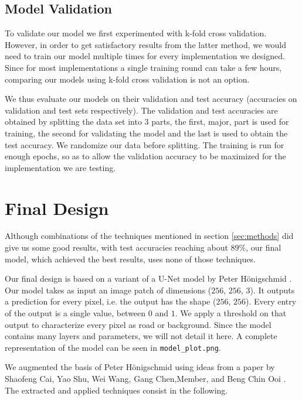 \documentclass[10pt,conference,compsocconf]{IEEEtran}
\begin{document}
\subsection{Model Validation} 
\label{ssec:model_validation}

To validate our model we first experimented with k-fold cross validation. However, in order to get satisfactory results from the latter method, we would need to train our model multiple times for every implementation we designed. Since for most implementations a single training round can take a few hours, comparing our models using k-fold cross validation is not an option.

We thus evaluate our models on their validation and test accuracy (accuracies on validation and test sets respectively). The validation and test accuracies are obtained by splitting the data set into 3 parts, the first, major, part is used for training, the second for validating the model and the last is used to obtain the test accuracy. We randomize our data before splitting. The training is run for enough epochs, so as to allow the validation accuracy to be maximized for the implementation we are testing.

\section{Final Design}
\label{sec:final}

Although combinations of the techniques mentioned in section \ref{sec:methods} did give us some good results, with test accuracies reaching about $89\%$, our final model, which achieved the best results, uses none of those techniques.

Our final design is based on a variant of a U-Net model by Peter Hönigschmid \cite{unet}. Our model takes as input an image patch of dimensions ($256$, $256$, $3$). It outputs a prediction for every pixel, i.e. the output has the shape ($256$, $256$). Every entry of the output is a single value, between $0$ and $1$. We apply a threshold on that output to characterize every pixel as road or background. Since the model contains many layers and parameters, we will not detail it here. A complete representation of the model can be seen in \texttt{model\_plot.png}. 

We augmented the basis of Peter Hönigschmid \cite{unet} using ideas from a paper by Shaofeng Cai, Yao Shu, Wei Wang, Gang Chen,Member, and Beng Chin Ooi \cite{final}. The extracted and applied techniques consist in the following.
\end{document}
